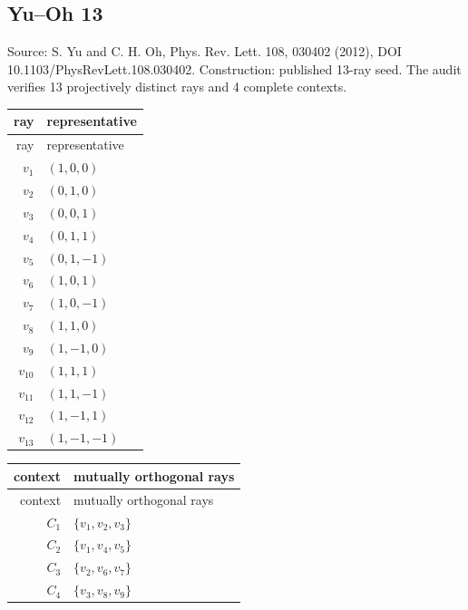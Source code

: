 \subsection{Yu--Oh 13}
\begingroup\sloppy Source: S. Yu and C. H. Oh, Phys. Rev. Lett. 108, 030402 (2012), DOI 10.1103/PhysRevLett.108.030402.  Construction: published 13-ray seed. The audit verifies 13 projectively distinct rays and 4 complete contexts.\par\endgroup
\begin{longtable}{@{}r l@{}}
\toprule
ray & representative\\
\midrule
\endfirsthead
\toprule
ray & representative\\
\midrule
\endhead
$v_{1}$ & $(1,0,0)$\\
$v_{2}$ & $(0,1,0)$\\
$v_{3}$ & $(0,0,1)$\\
$v_{4}$ & $(0,1,1)$\\
$v_{5}$ & $(0,1,-1)$\\
$v_{6}$ & $(1,0,1)$\\
$v_{7}$ & $(1,0,-1)$\\
$v_{8}$ & $(1,1,0)$\\
$v_{9}$ & $(1,-1,0)$\\
$v_{10}$ & $(1,1,1)$\\
$v_{11}$ & $(1,1,-1)$\\
$v_{12}$ & $(1,-1,1)$\\
$v_{13}$ & $(1,-1,-1)$\\
\bottomrule
\end{longtable}
\begin{longtable}{@{}r l@{}}
\toprule
context & mutually orthogonal rays\\
\midrule
\endfirsthead
\toprule
context & mutually orthogonal rays\\
\midrule
\endhead
$C_{1}$ & $\{v_{1},v_{2},v_{3}\}$\\
$C_{2}$ & $\{v_{1},v_{4},v_{5}\}$\\
$C_{3}$ & $\{v_{2},v_{6},v_{7}\}$\\
$C_{4}$ & $\{v_{3},v_{8},v_{9}\}$\\
\bottomrule
\end{longtable}

